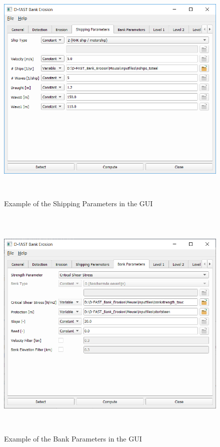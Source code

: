\clearpage
\begin{figure}[!ht]
\center
\vspace{-0.75cm} 
\includegraphics[width=\textwidth,height=11.4cm]{figures/gui4.png}
\caption{Example of the Shipping Parameters in the GUI}
\label{guiShip}
\vspace{-0.25cm} 
\end{figure}

\begin{figure}[!hb]
\center
\includegraphics[width=\textwidth,height=11.4cm]{figures/gui5.png}
\caption{Example of the Bank Parameters in the GUI}
\label{guiBank}
\vspace{-0.75cm} 
\end{figure}

